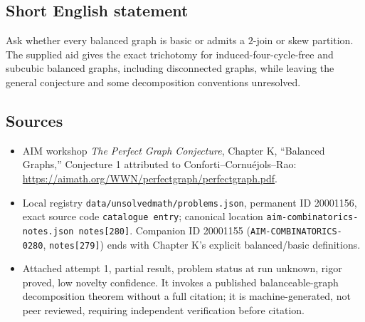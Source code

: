 \documentclass[11pt]{article}
\begin{document}
\subsection{Short English statement}
Ask whether every balanced graph is basic or admits a $2$-join or skew partition. The supplied aid gives the exact trichotomy for induced-four-cycle-free and subcubic balanced graphs, including disconnected graphs, while leaving the general conjecture and some decomposition conventions unresolved.
\subsection{Sources}
\begin{itemize}
\item AIM workshop \emph{The Perfect Graph Conjecture}, Chapter K, ``Balanced Graphs,'' Conjecture 1 attributed to Conforti--Cornu\'ejols--Rao: \url{https://aimath.org/WWN/perfectgraph/perfectgraph.pdf}.
\item Local registry \texttt{data/unsolvedmath/problems.json}, permanent ID 20001156, exact source code \texttt{catalogue entry}; canonical location \texttt{aim-combinatorics-notes.json notes[280]}. Companion ID 20001155 (\texttt{AIM-COMBINATORICS-0280}, \texttt{notes[279]}) ends with Chapter K's explicit balanced/basic definitions.
\item Attached attempt 1, partial result, problem status at run unknown, rigor proved, low novelty confidence. It invokes a published balanceable-graph decomposition theorem without a full citation; it is machine-generated, not peer reviewed, requiring independent verification before citation.
\end{itemize}
\end{document}
